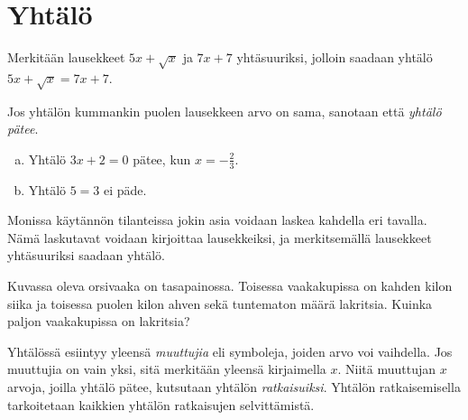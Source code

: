 \chapter{Yhtälö}


\begin{esimerkki}
Merkitään lausekkeet $5x+\sqrt{x}$ ja $7x+7$ yhtäsuuriksi, jolloin saadaan
yhtälö $5x+\sqrt{x} = 7x+7$.
\end{esimerkki}

Jos yhtälön kummankin puolen lausekkeen arvo on sama, sanotaan että \emph{yhtälö pätee}.

\begin{esimerkki}
\begin{enumerate}[a)]
\item Yhtälö $3x + 2 = 0$ pätee, kun $x = - \frac{2}{3}$.
\item Yhtälö $5 = 3$ ei päde.
\end{enumerate}
\end{esimerkki}

Monissa käytännön tilanteissa jokin asia voidaan laskea kahdella eri tavalla.
Nämä laskutavat voidaan kirjoittaa lausekkeiksi, ja merkitsemällä lausekkeet yhtäsuuriksi saadaan yhtälö.

\begin{esimerkki}
Kuvassa oleva orsivaaka on tasapainossa. Toisessa vaakakupissa on kahden kilon siika ja toisessa puolen kilon ahven sekä tuntematon määrä lakritsia. Kuinka paljon vaakakupissa on lakritsia?
\end{esimerkki}


Yhtälössä esiintyy yleensä \emph{muuttujia} eli symboleja, joiden arvo voi
vaihdella. Jos muuttujia on vain yksi, sitä merkitään yleensä kirjaimella $x$.
Niitä muuttujan $x$ arvoja, joilla yhtälö pätee, kutsutaan yhtälön \emph{ratkaisuiksi}.
Yhtälön ratkaisemisella tarkoitetaan kaikkien yhtälön ratkaisujen selvittämistä.


